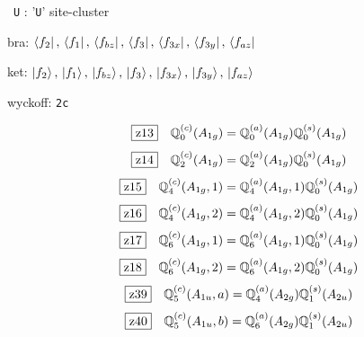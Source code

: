 \documentclass[fleqn,10pt,landscape]{jsarticle}
\begin{document}
\noindent\textbullet\, \texttt{U} : '\texttt{U}' site-cluster

\noindent\quad * bra: $\bra{f_{2}},\, \bra{f_{1}},\, \bra{f_{bz}},\, \bra{f_{3}},\, \bra{f_{3x}},\, \bra{f_{3y}},\, \bra{f_{az}}$

\noindent\quad * ket: $\ket{f_{2}},\, \ket{f_{1}},\, \ket{f_{bz}},\, \ket{f_{3}},\, \ket{f_{3x}},\, \ket{f_{3y}},\, \ket{f_{az}}$

\noindent\quad * wyckoff: \texttt{2c}

\begin{dmath*}
\hspace*{3mm}\fbox{z13}\quad \mathbb{Q}_{0}^{(c)}(A_{1g})=\mathbb{Q}_{0}^{(a)}(A_{1g}) \mathbb{Q}_{0}^{(s)}(A_{1g})
\end{dmath*}
\begin{dmath*}
\hspace*{3mm}\fbox{z14}\quad \mathbb{Q}_{2}^{(c)}(A_{1g})=\mathbb{Q}_{2}^{(a)}(A_{1g}) \mathbb{Q}_{0}^{(s)}(A_{1g})
\end{dmath*}
\begin{dmath*}
\hspace*{3mm}\fbox{z15}\quad \mathbb{Q}_{4}^{(c)}(A_{1g},1)=\mathbb{Q}_{4}^{(a)}(A_{1g},1) \mathbb{Q}_{0}^{(s)}(A_{1g})
\end{dmath*}
\begin{dmath*}
\hspace*{3mm}\fbox{z16}\quad \mathbb{Q}_{4}^{(c)}(A_{1g},2)=\mathbb{Q}_{4}^{(a)}(A_{1g},2) \mathbb{Q}_{0}^{(s)}(A_{1g})
\end{dmath*}
\begin{dmath*}
\hspace*{3mm}\fbox{z17}\quad \mathbb{Q}_{6}^{(c)}(A_{1g},1)=\mathbb{Q}_{6}^{(a)}(A_{1g},1) \mathbb{Q}_{0}^{(s)}(A_{1g})
\end{dmath*}
\begin{dmath*}
\hspace*{3mm}\fbox{z18}\quad \mathbb{Q}_{6}^{(c)}(A_{1g},2)=\mathbb{Q}_{6}^{(a)}(A_{1g},2) \mathbb{Q}_{0}^{(s)}(A_{1g})
\end{dmath*}
\begin{dmath*}
\hspace*{3mm}\fbox{z39}\quad \mathbb{Q}_{5}^{(c)}(A_{1u},a)=\mathbb{Q}_{4}^{(a)}(A_{2g}) \mathbb{Q}_{1}^{(s)}(A_{2u})
\end{dmath*}
\begin{dmath*}
\hspace*{3mm}\fbox{z40}\quad \mathbb{Q}_{5}^{(c)}(A_{1u},b)=\mathbb{Q}_{6}^{(a)}(A_{2g}) \mathbb{Q}_{1}^{(s)}(A_{2u})
\end{dmath*}
\end{document}
